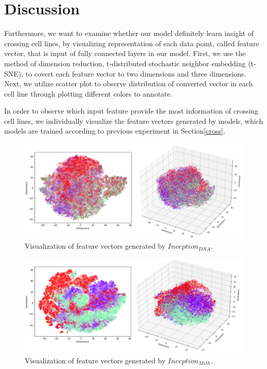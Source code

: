 \section{Discussion} \label{discuss}
Furthermore, we want to examine whether our model definitely learn insight of crossing cell lines, by visualizing representation of each data point, called feature vector, that is input of fully connected layers in our model. First, we use the method of dimension reduction, t-distributed stochastic neighbor embedding (t-SNE), to covert each feature vector to two dimensions and three dimensions. Next, we utilize scatter plot to observe distribution of converted vector in each cell line through plotting different colors to annotate.

In order to observe which input feature provide the most information of crossing cell lines, we individually visualize the feature vectors generated by models, which models are trained according to previous experiment in Section\ref{cross}.

\begin{figure}[H]
    \centering
    \includegraphics[width=1\columnwidth]{body/figure/figure17.png}
    \captionsetup{labelfont=bf}
    \renewcommand{\baselinestretch}{1.0}
    \caption[Visualization of feature vectors generated by $Inception_{DNA}$]{Visualization of feature vectors generated by $Inception_{DNA}$.}
    \label{f17}
\end{figure}

\begin{figure}[H]
    \centering
    \includegraphics[width=1\columnwidth]{body/figure/figure18.png}
    \captionsetup{labelfont=bf}
    \renewcommand{\baselinestretch}{1.0}
    \caption[Visualization of feature vectors generated by $Inception_{Meth}$]{Visualization of feature vectors generated by $Inception_{Meth}$.}
    \label{f18}
\end{figure}

